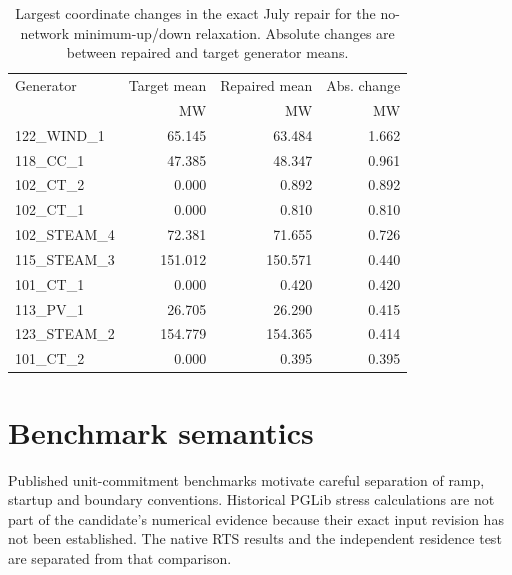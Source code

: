 \documentclass[10pt,journal,onecolumn]{IEEEtran}
\begin{document}
\begin{table}[t]
\centering
\caption{Largest coordinate changes in the exact July repair for the no-network minimum-up/down relaxation. Absolute changes are between repaired and target generator means.}
\label{tab:supp-coordinate-repair}
\begin{tabular}{lrrr}
\toprule
Generator & Target mean & Repaired mean & Abs. change\\
 & MW & MW & MW\\
\midrule
122\_WIND\_1 & 65.145 & 63.484 & 1.662\\
118\_CC\_1 & 47.385 & 48.347 & 0.961\\
102\_CT\_2 & 0.000 & 0.892 & 0.892\\
102\_CT\_1 & 0.000 & 0.810 & 0.810\\
102\_STEAM\_4 & 72.381 & 71.655 & 0.726\\
115\_STEAM\_3 & 151.012 & 150.571 & 0.440\\
101\_CT\_1 & 0.000 & 0.420 & 0.420\\
113\_PV\_1 & 26.705 & 26.290 & 0.415\\
123\_STEAM\_2 & 154.779 & 154.365 & 0.414\\
101\_CT\_2 & 0.000 & 0.395 & 0.395\\
\bottomrule
\end{tabular}
\end{table}

\section{Benchmark semantics}
Published unit-commitment benchmarks motivate careful separation of ramp, startup and boundary conventions. Historical PGLib stress calculations are not part of the candidate's numerical evidence because their exact input revision has not been established. The native RTS results and the independent residence test are separated from that comparison.
\end{document}
